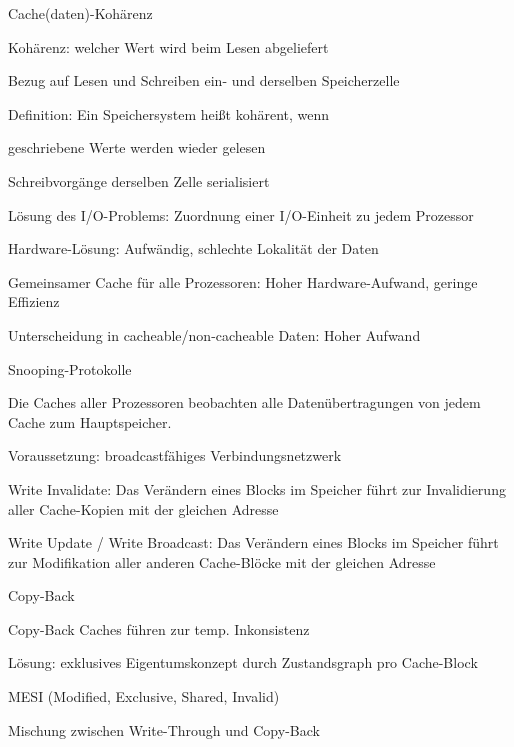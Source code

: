 \documentclass[10pt,landscape]{article}
\begin{document}
\begin{multicols}{3}
  Cache(daten)-Kohärenz
  \begin{itemize*}
    \item Kohärenz: welcher Wert wird beim Lesen abgeliefert
    \item Bezug auf Lesen und Schreiben ein- und derselben Speicherzelle
    \item Definition: Ein Speichersystem heißt kohärent, wenn
    \begin{itemize*}
      \item geschriebene Werte werden wieder gelesen
      \item Schreibvorgänge derselben Zelle serialisiert
    \end{itemize*}
    \item Lösung des I/O-Problems: Zuordnung einer I/O-Einheit zu jedem Prozessor
    \item Hardware-Lösung: Aufwändig, schlechte Lokalität der Daten
    \item Gemeinsamer Cache für alle Prozessoren: Hoher Hardware-Aufwand, geringe Effizienz
    \item Unterscheidung in cacheable/non-cacheable Daten: Hoher Aufwand
  \end{itemize*}
  
  Snooping-Protokolle
  \begin{itemize*}
    \item Die Caches aller Prozessoren beobachten alle Datenübertragungen von jedem Cache zum Hauptspeicher.
    \item Voraussetzung: broadcastfähiges Verbindungsnetzwerk
    \item Write Invalidate: Das Verändern eines Blocks im Speicher führt zur Invalidierung aller Cache-Kopien mit der gleichen Adresse
    \item Write Update / Write Broadcast: Das Verändern eines Blocks im Speicher führt zur Modifikation aller anderen Cache-Blöcke mit der gleichen Adresse
  \end{itemize*}
  
  Copy-Back
  \begin{itemize*}
    \item Copy-Back Caches führen zur temp. Inkonsistenz
    \item Lösung: exklusives Eigentumskonzept durch Zustandsgraph pro Cache-Block
    \item MESI (Modified, Exclusive, Shared, Invalid)
    \item Mischung zwischen Write-Through und Copy-Back
  \end{itemize*}
  

\end{multicols}
\end{document}
